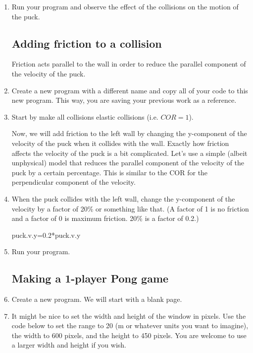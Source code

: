 \begin{enumerate}
\item Run your program and observe the effect of the collisions on the motion of the puck.

\subsection*{Adding friction to a collision}

Friction acts parallel to the wall in order to reduce the parallel component of the velocity of the puck.

\item Create a new program with a different name and copy all of your code to this new program. This way, you are saving your previous work as a reference.

\item Start by make all collisions elastic collisions (i.e. $COR=1$).

Now, we will add friction to the left wall by changing the y-component of the velocity of the puck when it collides with the wall.  Exactly how friction affects the velocity of the puck is a bit complicated. Let's use a simple (albeit unphysical) model that reduces the parallel component of the velocity of the puck by a certain percentage. This is similar to the COR for the perpendicular component of the velocity.

\item When the puck collides with the left wall, change the y-component of the velocity by a factor of 20\% or something like that. (A factor of 1 is no friction and a factor of 0 is maximum friction. 20\% is a factor of 0.2.)

\begin{myvpython}
        puck.v.y=0.2*puck.v.y
\end{myvpython}

\item Run your program.


\subsection*{Making a 1-player Pong game}

\item Create a new program. We will start with a blank page.

\item It might be nice to set the width and height of the window in pixels. Use the code below to set the range to 20 (m or whatever units you want to imagine), the width to 600 pixels, and the height to 450 pixels. You are welcome to use a larger width and height if you wish.


\end{enumerate}
